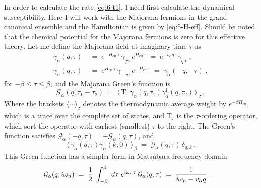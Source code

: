 In order to calculate the rate \eqref{eq:6-t1}, I need first calculate the dynamical susceptibility. Here I will work with the Majorana fermions in the grand canonical ensemble and the Hamiltonian is given by \eqref{eq:5-H-eff}. Should be noted that the chemical potential for the Majorana fermions is zero for this effective theory. Let me define the Majorana field at imaginary time $\tau$ as
\begin{align}
    \gamma_{\alpha}(q,\tau) \; &= \; e^{-H_{\text{eff}} \, \tau} \, \gamma_{q\alpha} \, e^{H_{\text{eff}} \, \tau}  \; = \; e^{- v_{\alpha}q\tau} \, \gamma_{q\alpha} \; , \\[6pt]
    \gamma_{\alpha}^{\dagger}(q,\tau) \; &= \; e^{H_{\text{eff}} \, \tau} \, \gamma_{-q\alpha} \, e^{-H_{\text{eff}} \, \tau} \; = \; \gamma_{\alpha}(-q,-\tau) \; , 
\end{align}
for $-\beta \leq \tau \leq \beta$, and the Majorana Green's function is
    \begin{equation}
        \mathcal{G}_{\alpha}(q , \tau_1-\tau_2 )  \; = \;     \langle \, \text{T}_{\tau} \, \gamma_{\alpha}(q,\tau_1) \gamma_{\alpha}^{\dagger}(q,\tau_2) \, \rangle_{ \, \beta}  \, , %
    \end{equation}
    Where the brackets $\langle \cdots  \rangle_{\beta}$ denotes the thermodynamic average weight by $e^{-\beta H_{\text{eff}}}$, which is a trace over the complete set of states, and $\text{T}_{\tau}$ is the $\tau$-ordering operator, which sort the operator with earliest (smallest) $\tau$ to the right.    The Green's function satisfies $\mathcal{G}_{\alpha}(-q , \tau ) = - \mathcal{G}_{\alpha}(q , \tau )$, %
    and 
    \begin{equation}
          \langle \,  \gamma_{\alpha}(q,\tau) \gamma_{\alpha}^{\dagger}(k, 0 ) \, \rangle_{ \, \beta}  \; = \;   \mathcal{G}_{\alpha}(q , \tau )  \, \delta_{q,k}  \,  .
    \end{equation}
This Green function has a simpler form in Matsubara frequency domain
    \begin{align}
        \mathcal{G}_{\alpha}(q , \dot{\imath} \omega_n ) 
        \; & = \; \frac{1}{2} \;  \int_{-\beta}^{\beta} \; d\tau \; e^{\dot{\imath} \omega_n \tau } \, \mathcal{G}_{\alpha}( q , \tau ) \; = \;   \frac{1}{\dot{\imath} \omega_n - v_{\alpha}q} \; . 
    \end{align}
    
